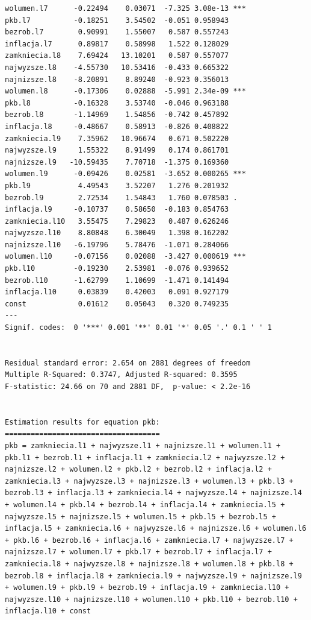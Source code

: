 \documentclass[
  polish,
  letterpaper,
  DIV=11,
  numbers=noendperiod]{scrartcl}
\begin{document}
\begin{verbatim}
wolumen.l7      -0.22494    0.03071  -7.325 3.08e-13 ***
pkb.l7          -0.18251    3.54502  -0.051 0.958943    
bezrob.l7        0.90991    1.55007   0.587 0.557243    
inflacja.l7      0.89817    0.58998   1.522 0.128029    
zamkniecia.l8    7.69424   13.10201   0.587 0.557077    
najwyzsze.l8    -4.55730   10.53416  -0.433 0.665322    
najnizsze.l8    -8.20891    8.89240  -0.923 0.356013    
wolumen.l8      -0.17306    0.02888  -5.991 2.34e-09 ***
pkb.l8          -0.16328    3.53740  -0.046 0.963188    
bezrob.l8       -1.14969    1.54856  -0.742 0.457892    
inflacja.l8     -0.48667    0.58913  -0.826 0.408822    
zamkniecia.l9    7.35962   10.96674   0.671 0.502220    
najwyzsze.l9     1.55322    8.91499   0.174 0.861701    
najnizsze.l9   -10.59435    7.70718  -1.375 0.169360    
wolumen.l9      -0.09426    0.02581  -3.652 0.000265 ***
pkb.l9           4.49543    3.52207   1.276 0.201932    
bezrob.l9        2.72534    1.54843   1.760 0.078503 .  
inflacja.l9     -0.10737    0.58650  -0.183 0.854763    
zamkniecia.l10   3.55475    7.29823   0.487 0.626246    
najwyzsze.l10    8.80848    6.30049   1.398 0.162202    
najnizsze.l10   -6.19796    5.78476  -1.071 0.284066    
wolumen.l10     -0.07156    0.02088  -3.427 0.000619 ***
pkb.l10         -0.19230    2.53981  -0.076 0.939652    
bezrob.l10      -1.62799    1.10699  -1.471 0.141494    
inflacja.l10     0.03839    0.42003   0.091 0.927179    
const            0.01612    0.05043   0.320 0.749235    
---
Signif. codes:  0 '***' 0.001 '**' 0.01 '*' 0.05 '.' 0.1 ' ' 1


Residual standard error: 2.654 on 2881 degrees of freedom
Multiple R-Squared: 0.3747, Adjusted R-squared: 0.3595 
F-statistic: 24.66 on 70 and 2881 DF,  p-value: < 2.2e-16 


Estimation results for equation pkb: 
==================================== 
pkb = zamkniecia.l1 + najwyzsze.l1 + najnizsze.l1 + wolumen.l1 + pkb.l1 + bezrob.l1 + inflacja.l1 + zamkniecia.l2 + najwyzsze.l2 + najnizsze.l2 + wolumen.l2 + pkb.l2 + bezrob.l2 + inflacja.l2 + zamkniecia.l3 + najwyzsze.l3 + najnizsze.l3 + wolumen.l3 + pkb.l3 + bezrob.l3 + inflacja.l3 + zamkniecia.l4 + najwyzsze.l4 + najnizsze.l4 + wolumen.l4 + pkb.l4 + bezrob.l4 + inflacja.l4 + zamkniecia.l5 + najwyzsze.l5 + najnizsze.l5 + wolumen.l5 + pkb.l5 + bezrob.l5 + inflacja.l5 + zamkniecia.l6 + najwyzsze.l6 + najnizsze.l6 + wolumen.l6 + pkb.l6 + bezrob.l6 + inflacja.l6 + zamkniecia.l7 + najwyzsze.l7 + najnizsze.l7 + wolumen.l7 + pkb.l7 + bezrob.l7 + inflacja.l7 + zamkniecia.l8 + najwyzsze.l8 + najnizsze.l8 + wolumen.l8 + pkb.l8 + bezrob.l8 + inflacja.l8 + zamkniecia.l9 + najwyzsze.l9 + najnizsze.l9 + wolumen.l9 + pkb.l9 + bezrob.l9 + inflacja.l9 + zamkniecia.l10 + najwyzsze.l10 + najnizsze.l10 + wolumen.l10 + pkb.l10 + bezrob.l10 + inflacja.l10 + const 


\end{verbatim}
\end{document}
